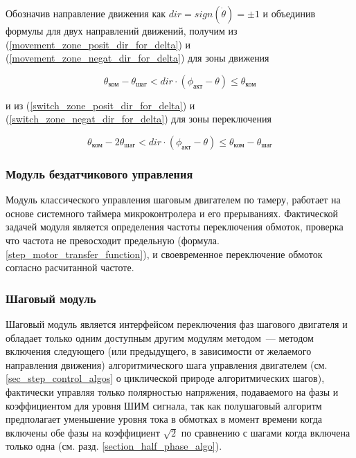 Обозначив направление движения как $\textit{dir} = sign(\dot \theta) = \pm 1$ и
объединив формулы для двух направлений движений, получим из
(\ref{movement_zone_posit_dir_for_delta}) и
(\ref{movement_zone_negat_dir_for_delta}) для зоны движения

\begin{equation}
    \label{movement_zone_for_delta}
    \theta_\textit{ком} - \theta_\textit{шаг}
    < dir \cdot (\phi_\textit{акт} - \theta)
    \leq \theta_\textit{ком}
\end{equation}

и из (\ref{switch_zone_posit_dir_for_delta})
и (\ref{switch_zone_negat_dir_for_delta}) для зоны переключения

\begin{equation}
    \label{switch_zone_for_delta}
    \theta_\textit{ком} - 2\theta_\textit{шаг}
    < dir \cdot (\phi_\textit{акт} - \theta)
    \leq \theta_\textit{ком} - \theta_\textit{шаг}
\end{equation}


\subsubsection{Модуль бездатчикового управления}
\label{module_synchronized_control_desc}
Модуль классического управления шаговым двигателем по тамеру, работает на основе
системного таймера микроконтролера и его прерываниях. Фактической задачей модуля
является определения частоты переключения обмоток, проверка что частота не
превосходит предельную (формула. \ref{step_motor_transfer_function}), и
своевременное переключение обмоток согласно расчитанной частоте.

\subsubsection{Шаговый модуль}
\label{module_control_algo_desc}
Шаговый модуль является интерфейсом переключения фаз шагового двигателя и
обладает только одним доступным другим модулям методом~--- методом включения
следующего (или предыдущего, в зависимости от желаемого направления движения)
алгоритмического шага управления двигателем (см. \ref{sec_step_control_algos}
о циклической природе алгоритмических шагов), фактически управляя только
полярностью напряжения, подаваемого на фазы и коэффициентом для уровня ШИМ
сигнала, так как полушаговый алгоритм предполагает уменьшение уровня тока в
обмотках в момент времени когда включены обе фазы на коэффициент $\sqrt{2}$ по
сравнению с шагами когда включена только одна
(см. разд. \ref{section_half_phase_algo}).

